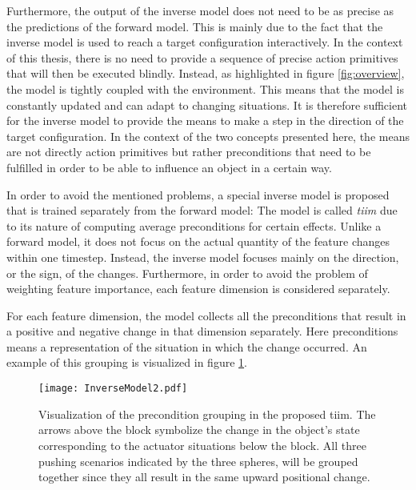Furthermore, the output of the inverse model does not need to be as precise as the predictions of the forward model. This is mainly due to the fact that the inverse model is used to reach a target configuration interactively. In the context of this thesis, there is no need to provide a sequence of precise action primitives that will then be executed blindly. Instead, as highlighted in figure \ref{fig:overview}, the model is tightly coupled with the environment. This means that the model is constantly updated and can adapt to changing situations. It is therefore sufficient for the inverse model to provide the means to make a step in the direction of the target configuration. In the context of the two concepts presented here, the means are not directly action primitives but rather preconditions that need to be fulfilled in order to be able to influence an object in a certain way.

In order to avoid the mentioned problems, a special inverse model is proposed that is trained separately from the forward model:
The model is called \textit{\gls{tiim}} due to its nature of computing average preconditions for certain effects.
Unlike a forward model, it does not focus on the actual quantity of the feature changes within one timestep. 
Instead, the inverse model focuses mainly on the direction, or the sign, of the changes. Furthermore, in order to avoid the problem of weighting feature importance, each feature dimension is considered separately. 

For each feature dimension, the model collects all the preconditions that result in a positive and negative change in that dimension separately. Here preconditions means a representation of the situation in which the change occurred.  
An example of this grouping is visualized in figure \ref{fig:InverseModel}. 

\begin{figure}
	\centering
	\texttt{[image: InverseModel2.pdf]}
	\caption{Visualization of the precondition grouping in the proposed \acrlong{tiim}. The arrows above the block symbolize the change in the object's state corresponding to the actuator situations below the block. All three pushing scenarios indicated by the three spheres, will be grouped together since they all result in the same upward positional change.}
	\label{fig:InverseModel}
\end{figure}

